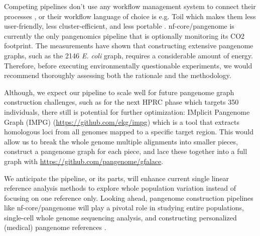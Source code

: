 \documentclass{bioinfo}
\theoremstyle{definition}
\begin{document}
	Competing pipelines don’t use any workflow management system to connect their processes \citep{Chin2023}, or their workflow language of choice is e.g. Toil \citep{Vivian2017, Hickey2023} which makes them less user-friendly, less cluster-efficient, and less portable \citep{Wratten2021}.
	nf-core/pangenome is currently the only pangenomics pipeline that is optionally monitoring its CO2 footprint. 
	The measurements have shown that constructing extensive pangenome graphs, such as the 2146 \textit{E. coli} graph, requires a considerable amount of energy. 
	Therefore, before executing environmentally questionable experiments, we would recommend thoroughly assessing both the rationale and the methodology. 
	
	Although, we expect our pipeline to scale well for future pangenome graph construction challenges, such as for the next HPRC phase which targets 350 individuals, there still is potential for further optimization: 
	IMplicit Pangenome Graph (IMPG) (\href{https://github.com/ekg/impg}{https://github.com/ekg/impg}) which is a tool that extracts homologous loci from all genomes mapped to a specific target region. 
	This would allow us to break the whole genome multiple alignments into smaller pieces, construct a pangenome graph for each piece, and lace these together into a full graph with \href{https://github.com/pangenome/gfalace}{https://github.com/pangenome/gfalace}. 
	
	We anticipate the pipeline, or its parts, will enhance current single linear reference analysis methods to explore whole population variation instead of focusing on one reference only. Looking ahead, pangenome construction pipelines like nf-core/pangenome will play a pivotal role in studying entire populations, single-cell whole genome sequencing analysis, and constructing personalized (medical) pangenome references \citep{Sirn2023}.
	\vspace{-0.6cm}
\end{document}
